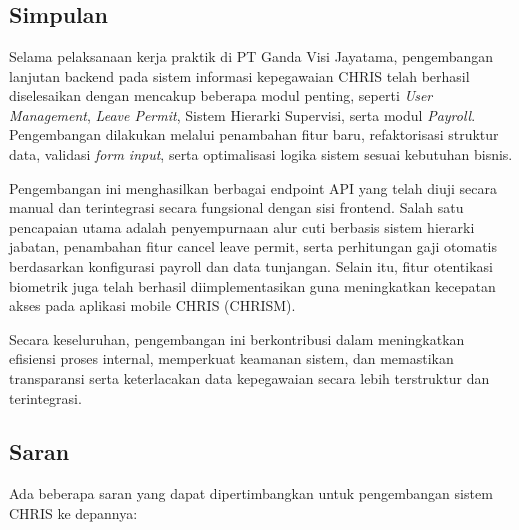 \chapter{\babEmpat}


\section{Simpulan}
Selama pelaksanaan kerja praktik di PT Ganda Visi Jayatama, pengembangan lanjutan backend pada sistem informasi kepegawaian CHRIS telah berhasil diselesaikan dengan mencakup beberapa modul penting, seperti \textit{User Management}, \textit{Leave Permit}, Sistem Hierarki Supervisi, serta modul \textit{Payroll}. Pengembangan dilakukan melalui penambahan fitur baru, refaktorisasi struktur data, validasi \textit{form input}, serta optimalisasi logika sistem sesuai kebutuhan bisnis.

Pengembangan ini menghasilkan berbagai endpoint API yang telah diuji secara manual dan terintegrasi secara fungsional dengan sisi frontend. Salah satu pencapaian utama adalah penyempurnaan alur cuti berbasis sistem hierarki jabatan, penambahan fitur cancel leave permit, serta perhitungan gaji otomatis berdasarkan konfigurasi payroll dan data tunjangan. Selain itu, fitur otentikasi biometrik juga telah berhasil diimplementasikan guna meningkatkan kecepatan akses pada aplikasi mobile CHRIS (CHRISM).

Secara keseluruhan, pengembangan ini berkontribusi dalam meningkatkan efisiensi proses internal, memperkuat keamanan sistem, dan memastikan transparansi serta keterlacakan data kepegawaian secara lebih terstruktur dan terintegrasi.


\section{Saran}
Ada beberapa saran yang dapat dipertimbangkan untuk pengembangan sistem CHRIS ke depannya:

